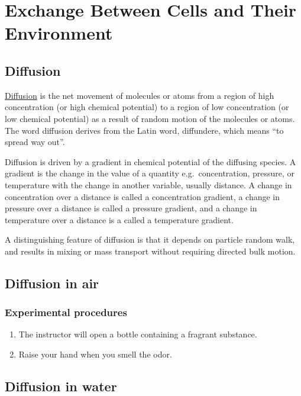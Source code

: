 \chapter{Exchange Between Cells and Their
Environment}\label{exchange-between-cells-and-their-environment}

\section{Diffusion}\label{diffusion}

\href{https://en.wikipedia.org/wiki/Diffusion}{Diffusion} is the net
movement of molecules or atoms from a region of high concentration (or
high chemical potential) to a region of low concentration (or low
chemical potential) as a result of random motion of the molecules or
atoms. The word diffusion derives from the Latin word, diffundere, which
means ``to spread way out''.

Diffusion is driven by a gradient in chemical potential of the diffusing
species. A gradient is the change in the value of a quantity
e.g.~concentration, pressure, or temperature with the change in another
variable, usually distance. A change in concentration over a distance is
called a concentration gradient, a change in pressure over a distance is
called a pressure gradient, and a change in temperature over a distance
is a called a temperature gradient.

A distinguishing feature of diffusion is that it depends on particle
random walk, and results in mixing or mass transport without requiring
directed bulk motion.

\section{Diffusion in air}\label{diffusion-in-air}

\subsection{Experimental procedures}\label{experimental-procedures-13}

\begin{enumerate}
\def\labelenumi{\arabic{enumi}.}
\tightlist
\item
  The instructor will open a bottle containing a fragrant substance.
\item
  Raise your hand when you smell the odor.
\end{enumerate}

\section{Diffusion in water}\label{diffusion-in-water}

